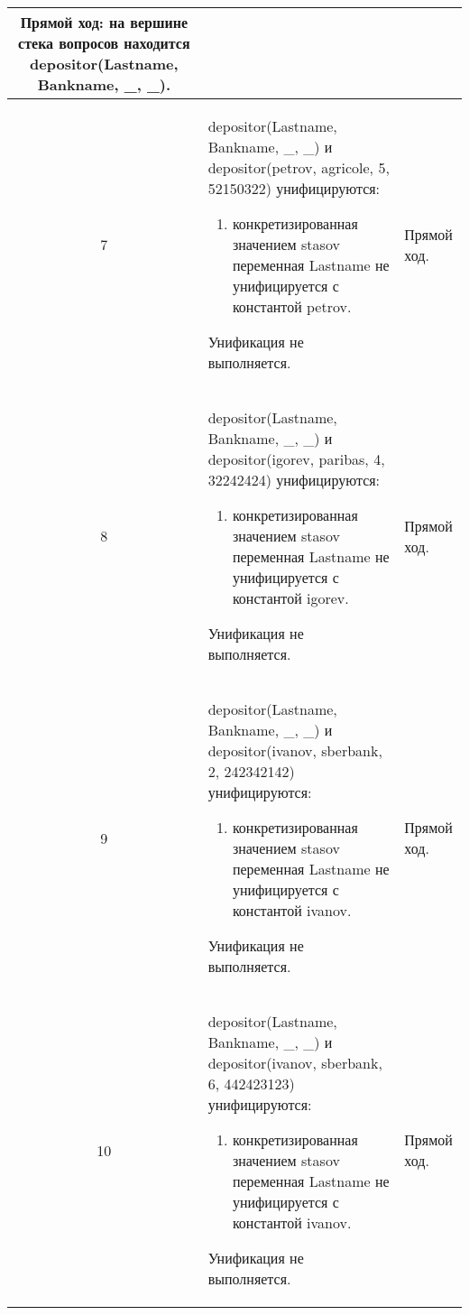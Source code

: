 \begin{longtable}{|c|p{}|p{}|}
    Прямой ход: на вершине стека вопросов находится depositor(Lastname, Bankname, \_, \_).
    \\ \hline

    7 &
    depositor(Lastname, Bankname, \_, \_) и
    depositor(petrov, agricole, 5, 52150322)
    унифицируются:
    \begin{enumerate}[label=\arabic*)]
        \item конкретизированная значением stasov переменная Lastname не унифицируется с константой petrov.
    \end{enumerate}

    Унификация не выполняется.
      &
    Прямой ход.
    \\ \hline

    8 &
    depositor(Lastname, Bankname, \_, \_) и
    depositor(igorev, paribas,  4, 32242424)
    унифицируются:
    \begin{enumerate}[label=\arabic*)]
        \item конкретизированная значением stasov переменная Lastname не унифицируется с константой igorev.
    \end{enumerate}

    Унификация не выполняется.
      &
    Прямой ход.
    \\ \hline

    9 &
    depositor(Lastname, Bankname, \_, \_) и
    depositor(ivanov, sberbank, 2, 242342142)
    унифицируются:
    \begin{enumerate}[label=\arabic*)]
        \item конкретизированная значением stasov переменная Lastname не унифицируется с константой ivanov.
    \end{enumerate}

    Унификация не выполняется.
      &
    Прямой ход.
    \\ \hline

    10 &
    depositor(Lastname, Bankname, \_, \_) и
    depositor(ivanov, sberbank, 6, 442423123)
    унифицируются:
    \begin{enumerate}[label=\arabic*)]
        \item конкретизированная значением stasov переменная Lastname не унифицируется с константой ivanov.
    \end{enumerate}

    Унификация не выполняется.
      &
    Прямой ход.
    \\ \hline


\end{longtable}
